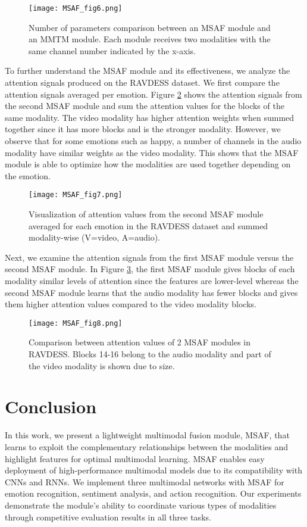 \documentclass[10pt,twocolumn,letterpaper]{article}
\begin{document}
\begin{figure}[h]
\centering
\texttt{[image: MSAF\_fig6.png]} \caption{Number of parameters comparison between an MSAF module and an MMTM \cite{joze2020mmtm} module. Each module receives two modalities with the same channel number indicated by the x-axis.}
\label{fig6}
\end{figure}

To further understand the MSAF module and its effectiveness, we analyze the attention signals produced on the RAVDESS dataset. We first compare the attention signals averaged per emotion. Figure \ref{fig7} shows the attention signals from the second MSAF module and sum the attention values for the blocks of the same modality. The video modality has higher attention weights when summed together since it has more blocks and is the stronger modality. However, we observe that for some emotions such as happy, a number of channels in the audio modality have similar weights as the video modality. 
This shows that the MSAF module is able to optimize how the modalities are used together depending on the emotion. 

\begin{figure}[ht]
\centering
\texttt{[image: MSAF\_fig7.png]} \caption{Visualization of attention values from the second MSAF module averaged for each emotion in the RAVDESS dataset and summed modality-wise (V=video, A=audio).}
\label{fig7}
\end{figure}

Next, we examine the attention signals from the first MSAF module versus the second MSAF module. In Figure \ref{fig8}, the first MSAF module gives blocks of each modality similar levels of attention since the features are lower-level whereas the second MSAF module learns that the audio modality has fewer blocks and gives them higher attention values compared to the video modality blocks. 


\begin{figure}[ht]
\centering
\texttt{[image: MSAF\_fig8.png]} \caption{Comparison between attention values of 2 MSAF modules in RAVDESS. Blocks 14-16 belong to the audio modality and part of the video modality is shown due to size.}
\label{fig8}
\end{figure}

\section{Conclusion}
In this work, we present a lightweight multimodal fusion module, MSAF, that learns to exploit the complementary relationships between the modalities and highlight features for optimal multimodal learning. MSAF enables easy deployment of high-performance multimodal models due to its compatibility with CNNs and RNNs. We implement three multimodal networks with MSAF for emotion recognition, sentiment analysis, and action recognition. Our experiments demonstrate the module’s ability to coordinate various types of modalities through competitive evaluation results in all three tasks.

{\small


}
\end{document}
